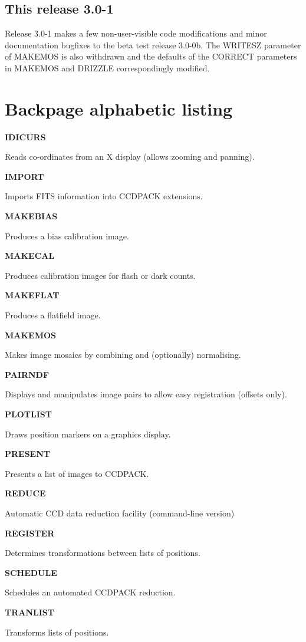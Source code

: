 \documentclass[twoside,11pt]{article}
\newcommand{\htmlref}[2]{#1}
\newenvironment{latexonly}{}{}
\renewcommand{\_}{\texttt{\symbol{95}}}
\newcommand{\quickdes}[3]{
                         \parbox{1.1in}{\bf #1}
                         \parbox{4.4in}{\raggedright #2 \dotfill}
                         \parbox{0.6in}{\pageref{#3}}
                         \vspace*{0.2in}}
\newcommand{\xroutine}[1]{\htmlref{{\sc #1}}{#1}}
\newcommand{\latexonlysection}[1]{\section{#1}}
\newcommand{\latexonlysection}[1]{#1}
\begin{document}
\subsection{This release 3.0-1}

  Release 3.0-1 makes a few non-user-visible code modifications and minor
  documentation bugfixes to the beta test release 3.0-0b.  The WRITESZ
  parameter of \xroutine{MAKEMOS} is also withdrawn and the defaults of
  the CORRECT parameters in \xroutine{MAKEMOS} and \xroutine{DRIZZLE} 
  correspondingly modified.


\begin{latexonly}

\cleardoublepage

\latexonlysection{Backpage alphabetic listing}

%
%

\quickdes{IDICURS}{Reads co-ordinates from an X display (allows
                   zooming and panning).}{IDICURS}

\quickdes{IMPORT}{Imports FITS information into CCDPACK extensions.}{IMPORT}

\quickdes{MAKEBIAS}{Produces a bias calibration image.}{MAKEBIAS}

\quickdes{MAKECAL}{Produces calibration images for flash or dark counts.}
                  {MAKECAL}

\quickdes{MAKEFLAT}{Produces a flatfield image.}
                   {MAKEFLAT}

\quickdes{MAKEMOS}{Makes image mosaics by combining and (optionally) normalising.}
                  {MAKEMOS}

\quickdes{PAIRNDF}{Displays and manipulates image pairs to allow easy
                   registration (offsets only).}
                  {PAIRNDF}

\quickdes{PLOTLIST}{Draws position markers on a graphics display.}
                   {PLOTLIST}

\quickdes{PRESENT}{Presents a list of images to CCDPACK.}{PRESENT}

\quickdes{REDUCE}{Automatic CCD data reduction facility (command-line version)}
                 {REDUCE}

\quickdes{REGISTER}{Determines transformations between lists of positions.}
                   {REGISTER}

\quickdes{SCHEDULE}{Schedules an automated CCDPACK reduction.}{SCHEDULE}

\quickdes{TRANLIST}{Transforms lists of positions.}
                   {TRANLIST}


\end{latexonly}
\end{document}
